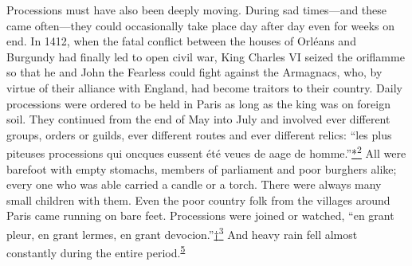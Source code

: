 Processions must have also been deeply moving. During sad times---and
these came often---they could occasionally take place day after day even
for weeks on end. In 1412, when the fatal conflict between the houses of
Orléans and Burgundy had finally led to open civil war, King Charles VI
seized the oriflamme so that he and John the Fearless could fight
against the Armagnacs, who, by virtue of their alliance with England,
had become traitors to their country. Daily processions were ordered to
be held in Paris as long as the king was on foreign soil. They continued
from the end of May into July and involved ever different groups, orders
or guilds, ever different routes and ever different relics: ``les plus
piteuses processions qui oncques eussent été veues de aage de
homme.''\protect\hypertarget{08_Chapter_One__THE_PASSIONATE_INTE.xhtmlux5cux23id_2252}{\protect\hyperlink{23_NOTES.xhtmlux5cux23id_2251}{*\textsuperscript{2}}}
All were barefoot with empty stomachs, members of parliament and poor
burghers alike; every one who was able carried a candle or a torch.
There were always many small children with them. Even the poor country
folk from the villages around Paris came running on bare feet.
Processions were joined or watched, ``en grant pleur, en grant lermes,
en grant
devocion.''\protect\hypertarget{08_Chapter_One__THE_PASSIONATE_INTE.xhtmlux5cux23id_2250}{\protect\hyperlink{23_NOTES.xhtmlux5cux23id_2249}{†\textsuperscript{3}}}
And heavy rain fell almost constantly during the entire
period.\textsuperscript{\protect\hypertarget{08_Chapter_One__THE_PASSIONATE_INTE.xhtmlux5cux23id_2220}{\protect\hyperlink{23_NOTES.xhtmlux5cux23id_2221}{5}}}

